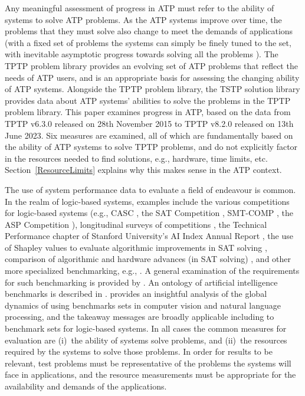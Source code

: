 \documentclass[runningheads]{llncs}
\begin{document}
Any meaningful assessment of progress in ATP must refer to the ability of systems to solve 
ATP problems.
As the ATP systems improve over time, the problems that they must solve also change to meet 
the demands of applications (with a fixed set of problems the systems can simply be finely 
tuned to the set, with inevitable asymptotic progress towards solving all the problems 
\cite{OB+22}).
The TPTP problem library provides an evolving set of ATP problems that reflect the needs of 
ATP users, and is an appropriate basis for assessing the changing ability of ATP systems.
Alongside the TPTP problem library, the TSTP solution library provides data about ATP systems' 
abilities to solve the problems in the TPTP problem library.
This paper examines progress in ATP, based on the data from TPTP v6.3.0 released on 
28th November 2015 to TPTP v8.2.0 released on 13th June 2023.
Six measures are examined, all of which
are fundamentally based on the ability of ATP systems to solve TPTP problems, and do not 
explicitly factor in the resources needed to find solutions, e.g., hardware, time limits, etc. 
Section~\ref{ResourceLimits} explains why this makes sense in the ATP context.

The use of system performance data to evaluate a field of endeavour is common.
In the realm of logic-based systems, examples include
the various competitions \cite{BB+19} for logic-based systems (e.g., CASC \cite{Sut16}, the SAT 
Competition \cite{JL+12}, SMT-COMP \cite{BdS05}, the ASP Competition \cite{CI+12}),
longitudinal surveys of competitions \cite{SS06-SoCASC,CSW15},
the Technical Performance chapter of Stanford University's AI Index Annual Report \cite{MF+23},
the use of Shapley values to evaluate algorithmic improvements in SAT solving \cite{FK+16,KF+19},
comparison of algorithmic and hardware advances (in SAT solving) \cite{FHS20},
and
other more specialized benchmarking, e.g., \cite{ZHP22}.
A general examination of the requirements for such benchmarking is provided by \cite{BLW19}.
An ontology of artificial intelligence benchmarks is described in \cite{BB+22-SD}.
\cite{OB+22} provides an insightful analysis of the global dynamics of using benchmarks sets in
computer vision and natural language processing, and the takeaway messages are broadly applicable 
including to benchmark sets for logic-based systems.
In all cases the common measures for evaluation are (i)~the ability of systems solve problems, 
and (ii)~the resources required by the systems to solve those problems.
In order for results to be relevant, test problems must be representative of the problems
the systems will face in applications, and the resource measurements must be appropriate for 
the availability and demands of the applications.
\end{document}
